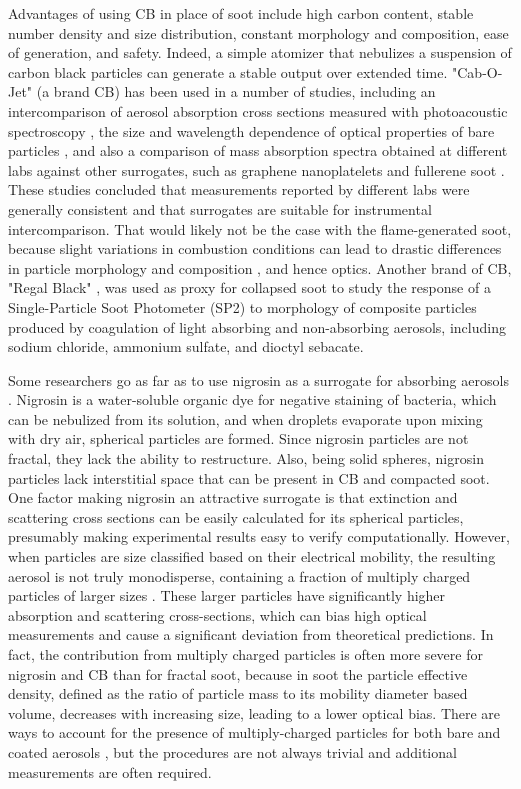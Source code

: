 Advantages of using CB in place of soot include high carbon content, stable number density and size distribution, constant morphology and composition, ease of generation, and safety. Indeed, a simple atomizer that nebulizes a suspension of carbon black particles can generate a stable output over extended time. "Cab-O-Jet" (a brand CB) has been used in a number of studies, including an intercomparison of aerosol absorption cross sections measured with photoacoustic spectroscopy \citep{RN3}, the size and wavelength dependence of optical properties of bare particles \citep{RN4}, and also a comparison of mass absorption spectra obtained at different labs against other surrogates, such as graphene nanoplatelets and fullerene soot \citep{RN63}. These studies concluded that measurements reported by different labs were generally consistent and that surrogates are suitable for instrumental intercomparison. That would likely not be the case with the flame-generated soot, because slight variations in combustion conditions can lead to drastic differences in particle morphology and composition \citep{moore2014mapping}, and hence optics. Another brand of CB, "Regal Black" \citep{RN65}, was used as proxy for collapsed soot to study the response of a Single-Particle Soot Photometer (SP2) to morphology of composite particles produced by coagulation of light absorbing and non-absorbing aerosols, including sodium chloride, ammonium sulfate, and dioctyl sebacate.

Some researchers go as far as to use nigrosin as a surrogate for absorbing aerosols \citep{RN8,RN54,RN55,RN56,RN57,drinovec2022dual}. Nigrosin is a water-soluble organic dye for negative staining of bacteria, which can be nebulized from its solution, and when droplets evaporate upon mixing with dry air, spherical particles are formed. Since nigrosin particles are not fractal, they lack the ability to restructure. Also, being solid spheres, nigrosin particles lack interstitial space that can be present in CB and compacted soot. One factor making nigrosin an attractive surrogate is that extinction and scattering cross sections can be easily calculated for its spherical particles, presumably making experimental results easy to verify computationally. However, when particles are size classified based on their electrical mobility, the resulting aerosol is not truly monodisperse, containing a fraction of multiply charged particles of larger sizes \citep{mcmurry2002relationship,pagels2009processing}. These larger particles have significantly higher absorption and scattering cross-sections, which can bias high optical measurements \citep{RN50} and cause a significant deviation from theoretical predictions. In fact, the contribution from multiply charged particles is often more severe for nigrosin and CB than for fractal soot, because in soot the particle effective density, defined as the ratio of particle mass to its mobility diameter based volume, decreases with increasing size, leading to a lower optical bias. There are ways to account for the presence of multiply-charged particles for both bare and coated aerosols \citep{RN67, RN77}, but the procedures are not always trivial and additional measurements are often required. 

